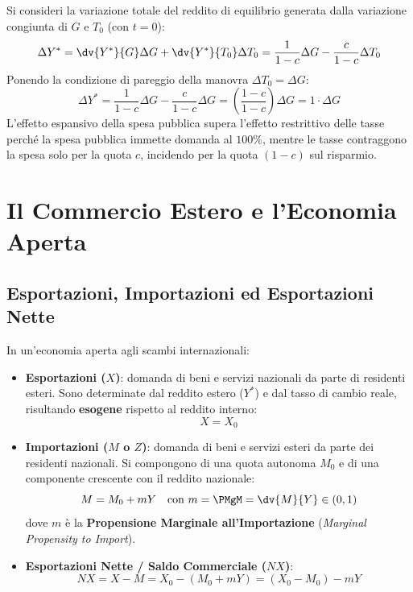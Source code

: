 \begin{dimostrazione}
Si consideri la variazione totale del reddito di equilibrio generata dalla variazione congiunta di $G$ e $T_0$ (con $t = 0$):
\begin{equation}
    \Delta Y^* = \dv{Y^*}{G} \Delta G + \dv{Y^*}{T_0} \Delta T_0 = \frac{1}{1 - c} \Delta G - \frac{c}{1 - c} \Delta T_0
\end{equation}
Ponendo la condizione di pareggio della manovra $\Delta T_0 = \Delta G$:
\begin{equation}
    \Delta Y^* = \frac{1}{1 - c} \Delta G - \frac{c}{1 - c} \Delta G = \left( \frac{1 - c}{1 - c} \right) \Delta G = 1 \cdot \Delta G
\end{equation}
L'effetto espansivo della spesa pubblica supera l'effetto restrittivo delle tasse perché la spesa pubblica immette domanda al $100\%$, mentre le tasse contraggono la spesa solo per la quota $c$, incidendo per la quota $(1-c)$ sul risparmio.
\end{dimostrazione}

\section{Il Commercio Estero e l'Economia Aperta}

\subsection{Esportazioni, Importazioni ed Esportazioni Nette}
In un'economia aperta agli scambi internazionali:
\begin{itemize}
    \item \textbf{Esportazioni ($X$)}: domanda di beni e servizi nazionali da parte di residenti esteri. Sono determinate dal reddito estero ($Y^*$) e dal tasso di cambio reale, risultando \textbf{esogene} rispetto al reddito interno:
    \begin{equation}
        X = X_0
    \end{equation}
    \item \textbf{Importazioni ($M$ o $Z$)}: domanda di beni e servizi esteri da parte dei residenti nazionali. Si compongono di una quota autonoma $M_0$ e di una componente crescente con il reddito nazionale:
    \begin{equation}
        M = M_0 + m Y \quad \text{con } m = \PMgM = \dv{M}{Y} \in (0, 1)
    \end{equation}
    dove $m$ è la \textbf{Propensione Marginale all'Importazione} (\textit{Marginal Propensity to Import}).
    
    \item \textbf{Esportazioni Nette / Saldo Commerciale ($NX$)}:
    \begin{equation}
        NX = X - M = X_0 - (M_0 + m Y) = (X_0 - M_0) - m Y
    \end{equation}
\end{itemize}

